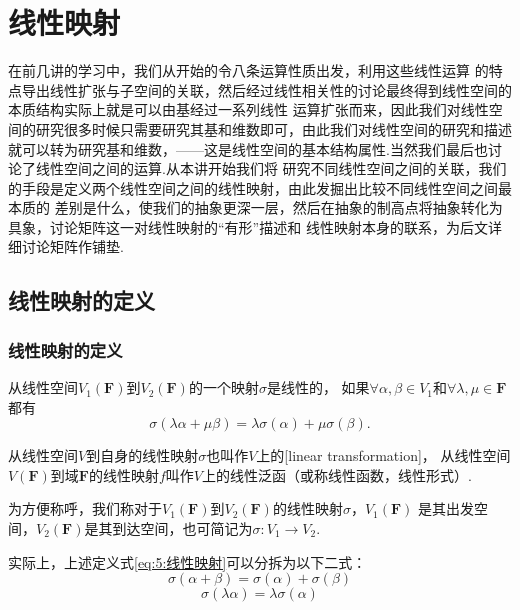 \chapter{线性映射}

在前几讲的学习中，我们从开始的令八条运算性质出发，利用这些线性运算
的特点导出线性扩张与子空间的关联，然后经过线性相关性的讨论最终得到线性空间的本质结构实际上就是可以由基经过一系列线性
运算扩张而来，因此我们对线性空间的研究很多时候只需要研究其基和维数即可，由此我们对线性空间的研究和描述
就可以转为研究基和维数，——这是线性空间的基本结构属性.当然我们最后也讨论了线性空间之间的运算.从本讲开始我们将
研究不同线性空间之间的关联，我们的手段是定义两个线性空间之间的线性映射，由此发掘出比较不同线性空间之间最本质的
差别是什么，使我们的抽象更深一层，然后在抽象的制高点将抽象转化为具象，讨论矩阵这一对线性映射的``有形''描述和
线性映射本身的联系，为后文详细讨论矩阵作铺垫.

\section{线性映射的定义}
\subsection{线性映射的定义}
\begin{definition}\label{def:3:线性映射的定义}
    从线性空间$V_1(\mathbf{F})$到$V_2(\mathbf{F})$的一个映射$\sigma$是线性的，
    如果$\forall \alpha,\beta \in V_1$和$\forall \lambda,\mu \in \mathbf{F}$都有
    \begin{equation}\label{eq:5:线性映射}
        \sigma(\lambda\alpha+\mu\beta)=\lambda\sigma(\alpha)+\mu\sigma(\beta).
    \end{equation}

    从线性空间$V$到自身的线性映射$\sigma$也叫作$V$上的[linear transformation]，
    从线性空间$V(\mathbf{F})$到域$\mathbf{F}$的线性映射$f$叫作$V$上的线性泛函（或称线性函数，线性形式）.

    为方便称呼，我们称对于$V_1(\mathbf{F})$到$V_2(\mathbf{F})$的线性映射$\sigma$，$V_1(\mathbf{F})$
    是其出发空间，$V_2(\mathbf{F})$是其到达空间，也可简记为$\sigma: V_1\to V_2$.
\end{definition}
实际上，上述定义式\eqref{eq:5:线性映射}可以分拆为以下二式：
\begin{equation} \tag{加性} %
    \sigma(\alpha+\beta)=\sigma(\alpha)+\sigma(\beta)
\end{equation}
\begin{equation} \tag{齐次性}
    \sigma(\lambda\alpha)=\lambda\sigma(\alpha)
\end{equation}

